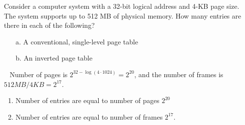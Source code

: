 \begin{exercise}[]{Consider a computer system with a 32-bit logical address and 4-KB page
    size. The system supports up to 512 MB of physical memory. How many
    entries are there in each of the following?
    \begin{enumerate}
        \item [a.] A conventional, single-level page table
        \item [b.] An inverted page table
    \end{enumerate}}
  \begin{solution}
  \par{~}
  Number of pages is $2^{32 - \log(4\cdot 1024)} = 2^{20}$, and the number of frames is $512 MB / 4 KB = 2^{17}$.
  \begin{enumerate}
      \item Number of entries are equal to number of pages $2^{20}$
      \item Number of entries are equal to number of frames $2^{17}$.
  \end{enumerate}
  
  \end{solution}
  \label{ex4}
\end{exercise}